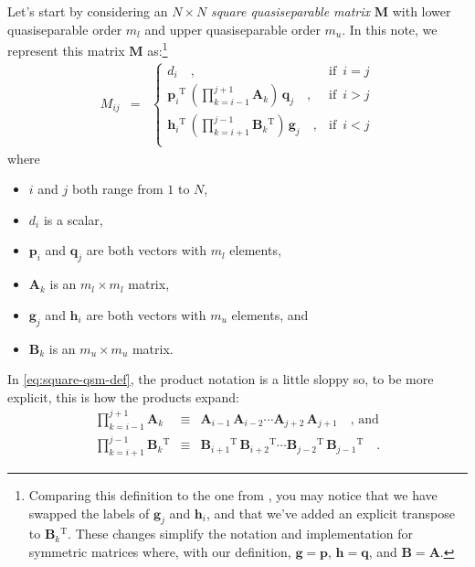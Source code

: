 \documentclass[modern]{aastex631}
\newcommand{\mv}[1]{\ensuremath{\boldsymbol{#1}}}
\newcommand{\mm}[1]{\ensuremath{\boldsymbol{#1}}}
\newcommand{\T}{\ensuremath{^\mathrm{T}}}
\begin{document}
Let's start by considering an $N \times N$ \emph{square quasiseparable matrix} $\mm{M}$ with lower quasiseparable order $m_l$ and upper quasiseparable order $m_u$.
In this note, we represent this matrix $\mm{M}$ as:\footnote{Comparing this definition to the one from \citet{Eidelman:1999}, you may notice that we have swapped the labels of $\mv{g}_j$ and $\mv{h}_i$, and that we've added an explicit transpose to $\mm{B}_k\T$. These changes simplify the notation and implementation for symmetric matrices where, with our definition, $\mv{g} = \mv{p}$, $\mv{h} = \mv{q}$, and $\mm{B} = \mm{A}$.}
%
\begin{eqnarray}\label{eq:square-qsm-def}
    M_{ij} &=& \left \{ \begin{array}{ll}
        d_i\quad,                                                                   & \mbox{if }\, i = j \\
        \mv{p}_i\T\,\left ( \prod_{k=i-1}^{j+1} \mm{A}_k \right )\,\mv{q}_j\quad,   & \mbox{if }\, i > j \\
        \mv{h}_i\T\,\left ( \prod_{k=i+1}^{j-1} \mm{B}_k\T \right )\,\mv{g}_j\quad, & \mbox{if }\, i < j \\
    \end{array}\right .
\end{eqnarray}
%
where
%
\begin{itemize}
    \item $i$ and $j$ both range from $1$ to $N$,
    \item $d_i$ is a scalar,
    \item $\mv{p}_i$ and $\mv{q}_j$ are both vectors with $m_l$ elements,
    \item $\mm{A}_k$ is an $m_l \times m_l$ matrix,
    \item $\mv{g}_j$ and $\mv{h}_i$ are both vectors with $m_u$ elements, and
    \item $\mm{B}_k$ is an $m_u \times m_u$ matrix.
\end{itemize}
%
In \autoref{eq:square-qsm-def}, the product notation is a little sloppy so, to be more explicit, this is how the products expand:
%
\begin{eqnarray}
    \prod_{k=i-1}^{j+1} \mm{A}_k &\equiv& \mm{A}_{i-1}\,\mm{A}_{i-2}\cdots\mm{A}_{j+2}\,\mm{A}_{j+1}\quad\mbox{, and} \nonumber\\
    \prod_{k=i+1}^{j-1} \mm{B}_k\T &\equiv& \mm{B}_{i+1}\T\,\mm{B}_{i+2}\T\cdots\mm{B}_{j-2}\T\,\mm{B}_{j-1}\T \quad.
\end{eqnarray}
\end{document}

